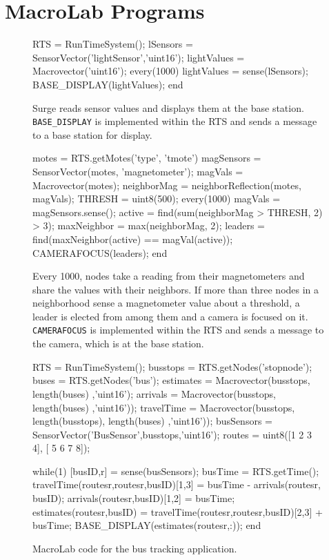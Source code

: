 \chapter{MacroLab Programs}
\label{appendix:macrolabPrograms}

\begin{figure}
  \begin{macrolab}
RTS = RunTimeSystem();
lSensors = SensorVector('lightSensor','uint16');
lightValues = Macrovector('uint16');
every(1000)
  lightValues =  sense(lSensors);
  BASE_DISPLAY(lightValues);
end
  \end{macrolab}
  \caption[A data collection application (Surge) in MacroLab]{Surge reads sensor
  values and displays them at the base station.  {\tt BASE\_DISPLAY} is
  implemented within the RTS and sends a message to a base station for display.}
  \label{code:Surge}
\end{figure}

\begin{figure}  
  \begin{macrolab}
motes = RTS.getMotes('type', 'tmote')
magSensors = SensorVector(motes, 'magnetometer');
magVals = Macrovector(motes);
neighborMag = neighborReflection(motes, magVals);
THRESH = uint8(500);
every(1000)
  magVals =  magSensors.sense();
  active = find(sum(neighborMag > THRESH, 2) > 3);
  maxNeighbor = max(neighborMag, 2);
  leaders = find(maxNeighbor(active) == magVal(active));
  CAMERAFOCUS(leaders);
end
  \end{macrolab}
  \caption[A tracking application (PEG) in MacroLab]{Every 1000\ms, nodes take a
  reading from their magnetometers and share the values with their neighbors.
  If more than three nodes in a neighborhood sense a magnetometer value about a
  threshold, a leader is elected from among them and a camera is focused on
  it. {\tt CAMERAFOCUS} is implemented within the RTS and sends a message to the
  camera, which is at the base station.}
  \label{code:PEG}
\end{figure}

\begin{figure*}[t]
  \begin{macrolab}
    RTS = RunTimeSystem();
    busstops = RTS.getNodes('stopnode'); 
    buses = RTS.getNodes('bus');
    estimates = Macrovector(busstops, length(buses) ,'uint16');
    arrivals = Macrovector(busstops, length(buses) ,'uint16'));
    travelTime = Macrovector(busstops, length(busstops), length(buses) ,'uint16'));
    busSensors = SensorVector('BusSensor',busstops,'uint16');
    routes = uint8({[1 2 3 4], [ 5 6 7 8]}); %

    while(1)
      [busID,r] =  sense(busSensors);
      busTime = RTS.getTime();
      travelTime(routes{r},routes{r},busID)[1,3] = busTime - arrivals(routes{r}, busID);
      arrivals(routes{r},busID)[1,2] = busTime;
      estimates(routes{r},busID) = travelTime(routes{r},routes{r},busID)[2,3] + busTime;
      BASE_DISPLAY(estimates(routes{r},:));
    end
  \end{macrolab}
  \caption[A bus tracking application in MacroLab]{MacroLab code for the bus
  tracking application.}
  \label{code:BusTracking}
\end{figure*}
